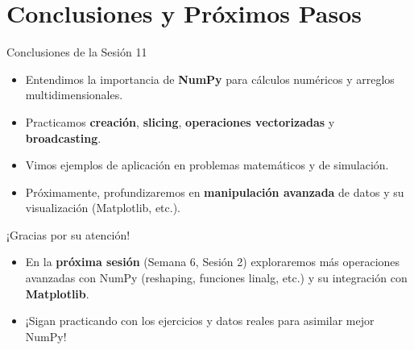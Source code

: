 \documentclass[10pt]{beamer}
\begin{document}
\section{Conclusiones y Próximos Pasos}

\begin{frame}{Conclusiones de la Sesión 11}
  \begin{itemize}
    \item Entendimos la importancia de \textbf{NumPy} para cálculos numéricos y arreglos multidimensionales.
    \item Practicamos \textbf{creación}, \textbf{slicing}, \textbf{operaciones vectorizadas} y \textbf{broadcasting}.
    \item Vimos ejemplos de aplicación en problemas matemáticos y de simulación.
    \item Próximamente, profundizaremos en \textbf{manipulación avanzada} de datos y su visualización (Matplotlib, etc.).
  \end{itemize}
\end{frame}

\begin{frame}
  \Huge{\centerline{¡Gracias por su atención!}}
  \vspace{0.3cm}
  \normalsize
  \begin{itemize}
    \item En la \textbf{próxima sesión} (Semana 6, Sesión 2) exploraremos más operaciones avanzadas con NumPy (reshaping, funciones linalg, etc.) y su integración con \textbf{Matplotlib}.
    \item ¡Sigan practicando con los ejercicios y datos reales para asimilar mejor NumPy!
  \end{itemize}
\end{frame}
\end{document}
